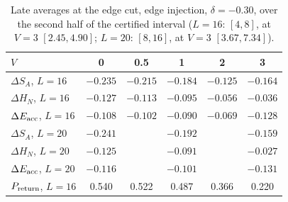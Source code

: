 \documentclass[11pt,a4paper]{article}
\begin{document}
\begin{table}[t]
  \centering
  \small
  \begin{tabular}{lccccc}
    \toprule
    $V$ & 0 & 0.5 & 1 & 2 & 3 \\
    \midrule
    $\Delta S_A$, $L=16$ & $-0.235$ & $-0.215$ & $-0.184$ & $-0.125$ & $-0.164$ \\
    $\Delta H_N$, $L=16$ & $-0.127$ & $-0.113$ & $-0.095$ & $-0.056$ & $-0.036$ \\
    $\Delta E_{\rm acc}$, $L=16$ & $-0.108$ & $-0.102$ & $-0.090$ & $-0.069$ & $-0.128$ \\
    $\Delta S_A$, $L=20$ & $-0.241$ & & $-0.192$ & & $-0.159$ \\
    $\Delta H_N$, $L=20$ & $-0.125$ & & $-0.091$ & & $-0.027$ \\
    $\Delta E_{\rm acc}$, $L=20$ & $-0.116$ & & $-0.101$ & & $-0.131$ \\
    $P_{\rm return}$, $L=16$ & 0.540 & 0.522 & 0.487 & 0.366 & 0.220 \\
    \bottomrule
  \end{tabular}
  \caption{Late averages at the edge cut, edge injection, $\delta=-0.30$, over the second half of the certified interval ($L=16$: $[4,8]$, at $V=3$ $[2.45,4.90]$; $L=20$: $[8,16]$, at $V=3$ $[3.67,7.34]$).}
  \label{tab:step5late}
\end{table}
\end{document}
